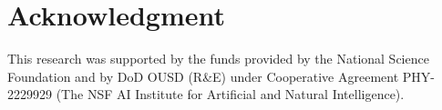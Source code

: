 \section*{Acknowledgment}
This research was supported by the funds provided by the National Science Foundation and by DoD OUSD (R\&E) under Cooperative Agreement PHY-2229929 (The NSF AI Institute for Artificial and Natural Intelligence).